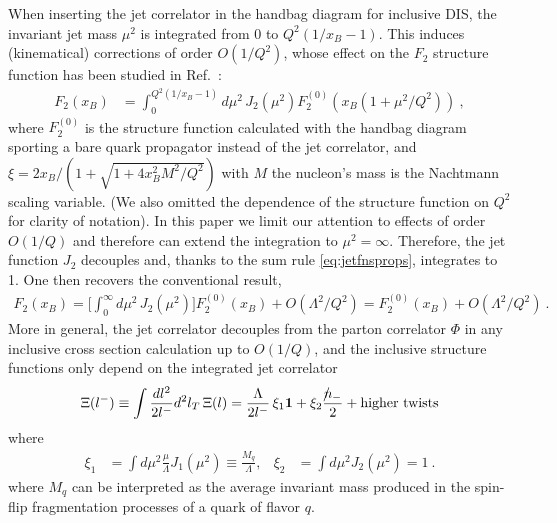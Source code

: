 \documentclass[preprintnumbers,floatfix,nofootinbib]{revtex4}
\newcommand{\nslash}{n \hspace{-0.24cm} / \,}
\newcommand{\mj}{M_q}
\newcommand{\mjs}{\langle m_j^2 \rangle>}
\begin{document}
When inserting the jet correlator in the handbag diagram for inclusive DIS,
the invariant jet mass $\mu^2$ is integrated from 0 to $Q^2(1/x_B-1)$. This
induces (kinematical) corrections of order $O(1/Q^2)$, whose effect on the
$F_2$ structure function has been studied in Ref.~\cite{Accardi:2008ne}: 
\begin{align}
  F_2(x_B) & = \int_0^{Q^2(1/x_B-1)}d\mu^2\, J_2(\mu^2) F_2^{(0)}(x_B(1+\mu^2/Q^2)) \ ,
\label{eq:F2}
\end{align}
where $F_2^{(0)}$ is the structure function calculated with the handbag
diagram sporting a bare quark propagator instead of the jet correlator, and
$\xi=2x_B/(1+\sqrt{1+4x_B^2M^2/Q^2})$ with $M$ the nucleon's mass is the
Nachtmann scaling variable. (We also omitted the dependence of the structure
function on $Q^2$ for clarity of notation). In this paper we limit our
attention to effects of order $O(1/Q)$ and therefore can extend the
integration to $\mu^2=\infty$. Therefore, the jet function $J_2$ decouples
and, thanks to the sum rule \eqref{eq:jetfnsprops}, integrates to 1. One then
recovers the conventional result, 
\begin{align}
  F_2(x_B) = \Big[ \int_0^\infty d\mu^2\, J_2(\mu^2) \Big] F_2^{(0)}(x_B) 
     + O(\Lambda^2/Q^2) = F_2^{(0)}(x_B)  + O(\Lambda^2/Q^2) \ .
\end{align}
%
More in general, the jet correlator decouples from the parton correlator $\Phi$ in any inclusive cross section calculation up to $O(1/Q)$, and the inclusive structure functions only depend on the integrated jet correlator 
\begin{equation} 
  \Xi(l^-) \equiv \int \frac{dl^2}{2l^-} d^2 l_T \, \Xi(l) 
    =  \frac{\Lambda}{2 l^-}\,\xi_1 {\bm 1}
    +  \xi_2 \frac{\nslash_-}{2} 
    + \text{higher\ twists}
\end{equation} 
where 
\begin{align}
\xi_1 &= \int d\mu^2 \frac{\mu}{\Lambda} J_1(\mu^2) 
       \equiv \frac{\mj}{\Lambda},
&
\xi_2 &= \int d\mu^2 J_2(\mu^2) = 1 \ .
\end{align} 
where $\mj$ can be interpreted as the average invariant mass produced in the spin-flip fragmentation processes of a quark of flavor $q$.
\end{document}
